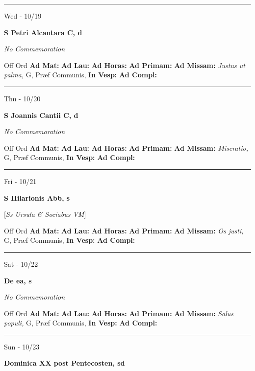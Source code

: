 \documentclass[letterpaper, 10pt]{article}
\begin{document}
\hrule
\begin{center}
Wed - 10/19
\end{center}\textbf{ \large S Petri Alcantara C, \textnormal{\normalsize d}}

\textit{No Commemoration}\begin{justify}
Off Ord
\textbf{Ad Mat: }
\textbf{Ad Lau: }
\textbf{Ad Horas: }
\textbf{Ad Primam: }
\textbf{Ad Missam:} \textit{Justus ut palma, } G, Præf Communis, 
\textbf{In Vesp: }
\textbf{Ad Compl: }\end{justify}



\hrule
\begin{center}
Thu - 10/20
\end{center}\textbf{ \large S Joannis Cantii C, \textnormal{\normalsize d}}

\textit{No Commemoration}\begin{justify}
Off Ord
\textbf{Ad Mat: }
\textbf{Ad Lau: }
\textbf{Ad Horas: }
\textbf{Ad Primam: }
\textbf{Ad Missam:} \textit{Miseratio, } G, Præf Communis, 
\textbf{In Vesp: }
\textbf{Ad Compl: }\end{justify}



\hrule
\begin{center}
Fri - 10/21
\end{center}\textbf{ \large S Hilarionis Abb, \textnormal{\normalsize s}}

[\textit{Ss Ursula \& Sociabus VM}]
\begin{justify}
Off Ord
\textbf{Ad Mat: }
\textbf{Ad Lau: }
\textbf{Ad Horas: }
\textbf{Ad Primam: }
\textbf{Ad Missam:} \textit{Os justi, } G, Præf Communis, 
\textbf{In Vesp: }
\textbf{Ad Compl: }\end{justify}



\hrule
\begin{center}
Sat - 10/22
\end{center}\textbf{ \large De ea, \textnormal{\normalsize s}}

\textit{No Commemoration}\begin{justify}
Off Ord
\textbf{Ad Mat: }
\textbf{Ad Lau: }
\textbf{Ad Horas: }
\textbf{Ad Primam: }
\textbf{Ad Missam:} \textit{Salus populi, } G, Præf Communis, 
\textbf{In Vesp: }
\textbf{Ad Compl: }\end{justify}



\hrule
\begin{center}
Sun - 10/23
\end{center}\textbf{ \large Dominica XX post Pentecosten, \textnormal{\normalsize sd}}
\end{document}
